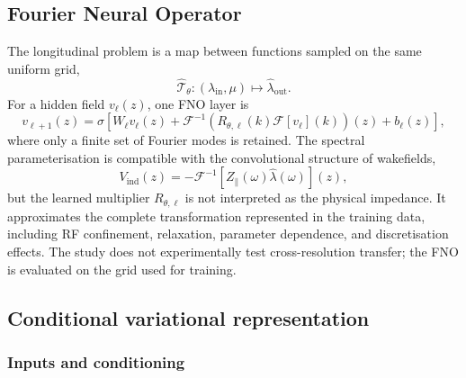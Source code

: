 \subsection{Fourier Neural Operator}
\label{subsec:fourier_neural_operator}

The longitudinal problem is a map between functions sampled on the same uniform grid,
\begin{equation}
    \widehat{\mathcal{T}}_{\theta}:
    (\lambda_{\mathrm{in}},\mu)
    \longmapsto
    \widehat{\lambda}_{\mathrm{out}}.
    \label{eq:fno_main_task}
\end{equation}
For a hidden field $v_{\ell}(z)$, one FNO layer is
\begin{equation}
    v_{\ell+1}(z)
    =
    \sigma\!\left[
        W_{\ell}v_{\ell}(z)
        +
        \mathcal{F}^{-1}
        \left(
            R_{\theta,\ell}(k)\mathcal{F}[v_{\ell}](k)
        \right)(z)
        +b_{\ell}(z)
    \right],
    \label{eq:fno_layer_revised}
\end{equation}
where only a finite set of Fourier modes is retained. The spectral parameterisation is compatible with the convolutional structure of wakefields,
\begin{equation}
    V_{\mathrm{ind}}(z)
    =
    -\mathcal{F}^{-1}
    \left[
        Z_{\parallel}(\omega)\widehat{\lambda}(\omega)
    \right](z),
\end{equation}
but the learned multiplier $R_{\theta,\ell}$ is not interpreted as the physical impedance. It approximates the complete transformation represented in the training data, including RF confinement, relaxation, parameter dependence, and discretisation effects. The study does not experimentally test cross-resolution transfer; the FNO is evaluated on the grid used for training.

\subsection{Conditional variational representation}
\label{subsec:variational_latent_representation}

\subsubsection{Inputs and conditioning}

